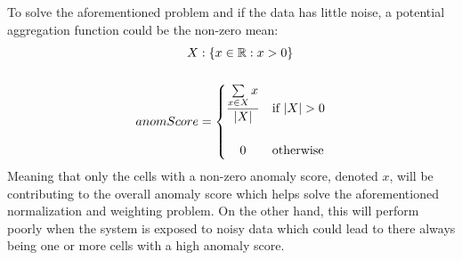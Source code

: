 To solve the aforementioned problem and if the data has little noise, a potential aggregation function could be the non-zero mean:
\begin{align*}
    X         & :\{x \in \mathbb{R} : x > 0\} \\
    \\
    anomScore & =
    \begin{cases}
        \dfrac{\sum\limits_{x \in X}x}{|X|} & \text{if } |X| > 0 \\
        \\
        \hfil 0                             & \text{otherwise}
    \end{cases}
\end{align*}
Meaning that only the cells with a non-zero anomaly score, denoted $x$, will be contributing to the overall anomaly score which helps solve the aforementioned normalization and weighting problem. On the other hand, this will perform poorly when the system is exposed to noisy data which could lead to there always being one or more cells with a high anomaly score.
